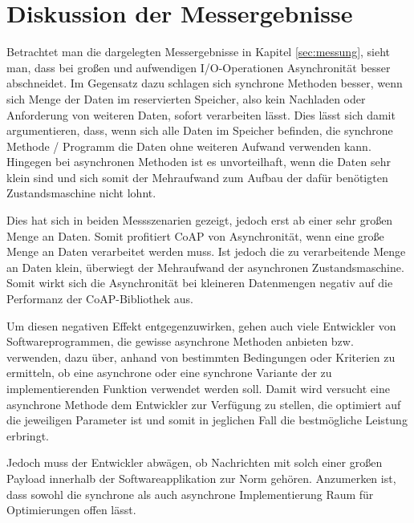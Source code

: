 \section{Diskussion der Messergebnisse}
\label{sec:diskussion-der-messergebnisse}

Betrachtet man die dargelegten Messergebnisse in Kapitel \ref{sec:messung}, sieht man, dass bei großen und aufwendigen I/O-Operationen Asynchronität besser abschneidet. Im Gegensatz dazu schlagen sich synchrone Methoden besser, wenn sich Menge der Daten im reservierten Speicher, also kein Nachladen oder Anforderung von weiteren Daten, sofort verarbeiten lässt. Dies lässt sich damit argumentieren, dass, wenn sich alle Daten im Speicher befinden, die synchrone Methode / Programm die Daten ohne weiteren Aufwand verwenden kann. Hingegen bei asynchronen Methoden ist es unvorteilhaft, wenn die Daten sehr klein sind und sich somit der Mehraufwand zum Aufbau der dafür benötigten Zustandsmaschine nicht lohnt.

Dies hat sich in beiden Messszenarien gezeigt, jedoch erst ab einer sehr großen Menge an Daten. Somit profitiert CoAP von Asynchronität, wenn eine große Menge an Daten verarbeitet werden muss. Ist jedoch die zu verarbeitende Menge an Daten klein, überwiegt der Mehraufwand der asynchronen Zustandsmaschine. Somit wirkt sich die Asynchronität bei kleineren Datenmengen negativ auf die Performanz der CoAP-Bibliothek aus.

Um diesen negativen Effekt entgegenzuwirken, gehen auch viele Entwickler von Softwareprogrammen, die gewisse asynchrone Methoden anbieten bzw. verwenden, dazu über, anhand von bestimmten Bedingungen oder Kriterien zu ermitteln, ob eine asynchrone oder eine synchrone Variante der zu implementierenden Funktion verwendet werden soll. Damit wird versucht eine asynchrone Methode dem Entwickler zur Verfügung zu stellen, die optimiert auf die jeweiligen Parameter ist und somit in jeglichen Fall die bestmögliche Leistung erbringt.

Jedoch muss der Entwickler abwägen, ob Nachrichten mit solch einer großen Payload innerhalb der Softwareapplikation zur Norm gehören. Anzumerken ist, dass sowohl die synchrone als auch asynchrone Implementierung Raum für Optimierungen offen lässt.